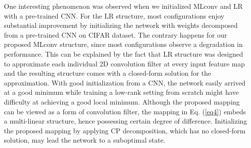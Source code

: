 \documentclass[conference,usletter]{IEEEtran}
\begin{document}
\begin{table*}[bp]	
	\begin{center}
		\caption{Forward Computation Time on CIFAR10 (normalized with respect to Conv)}\label{t4}
	\end{center}
\end{table*}

One interesting phenomenon was observed when we initialized MLconv and LR with a pre-trained CNN. For the LR structure, most configurations enjoy substantial improvement by initializing the network with weights decomposed from a pre-trained CNN on CIFAR dataset. The contrary happens for our proposed MLconv structure, since most configurations observe a degradation in performance. This can be explained by the fact that LR structure was designed to approximate each individual 2D convolution filter at every input feature map and the resulting structure comes with a closed-form solution for the approximation. With good initialization from a CNN, the network easily arrived at a good minimum while training a low-rank setting from scratch might have difficulty at achieving a good local minimum. Although the proposed mapping can be viewed as a form of convolution filter, the mapping in Eq. (\ref{eq4}) embeds a multi-linear structure, hence possessing certain degree of difference. Initializing the proposed mapping by applying CP decomposition, which has no closed-form solution, may lead the network to a suboptimal state.
\end{document}
